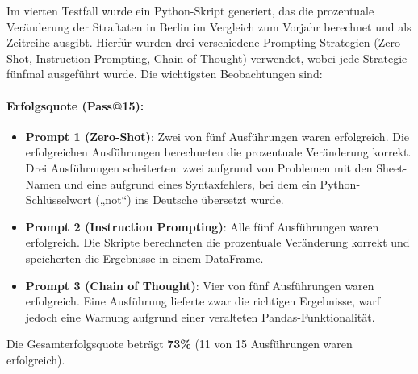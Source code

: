 \documentclass[11pt,a4paper]{article}
\begin{document}
Im vierten Testfall wurde ein Python-Skript generiert, das die prozentuale Veränderung der Straftaten in Berlin im Vergleich zum Vorjahr berechnet und als Zeitreihe ausgibt. Hierfür wurden drei verschiedene Prompting-Strategien (Zero-Shot, Instruction Prompting, Chain of Thought) verwendet, wobei jede Strategie fünfmal ausgeführt wurde. Die wichtigsten Beobachtungen sind:

\paragraph{Erfolgsquote (Pass@15):}
\begin{itemize}
    \item \textbf{Prompt 1 (Zero-Shot)}: Zwei von fünf Ausführungen waren erfolgreich. Die erfolgreichen Ausführungen berechneten die prozentuale Veränderung korrekt. Drei Ausführungen scheiterten: zwei aufgrund von Problemen mit den Sheet-Namen und eine aufgrund eines Syntaxfehlers, bei dem ein Python-Schlüsselwort („not“) ins Deutsche übersetzt wurde.
    \item \textbf{Prompt 2 (Instruction Prompting)}: Alle fünf Ausführungen waren erfolgreich. Die Skripte berechneten die prozentuale Veränderung korrekt und speicherten die Ergebnisse in einem DataFrame.
    \item \textbf{Prompt 3 (Chain of Thought)}: Vier von fünf Ausführungen waren erfolgreich. Eine Ausführung lieferte zwar die richtigen Ergebnisse, warf jedoch eine Warnung aufgrund einer veralteten Pandas-Funktionalität.
\end{itemize}
Die Gesamterfolgsquote beträgt \textbf{73\%} (11 von 15 Ausführungen waren erfolgreich).
\begin{table}[h]
    \centering
    \caption{Ergebnisse von Testfall 4}
    \label{tab:auswertung_testfall4}
\end{table}
\end{document}
